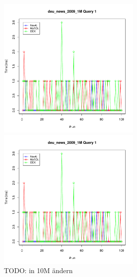 \documentclass[11pt, a4paper, oneside]{article} %
\begin{document}
\begin{appendix}
\begin{figure}[ht]
\begin{minipage}[hbt]{7cm}
	\centering
	\includegraphics[width=7cm]{../results/cold caches/images/1M_query1_perf}
	\caption{...}
	\label{fig:1M_query2_perf}
\end{minipage}
\hfill
\begin{minipage}[hbt]{7cm}
	\centering
	\includegraphics[width=7cm]{../results/cold caches/images/1M_query1_perf}
	\caption{TODO: in 10M ändern}
	\label{fig:10M_query1_perf}
\end{minipage}


\end{figure}
\end{appendix}
\end{document}
